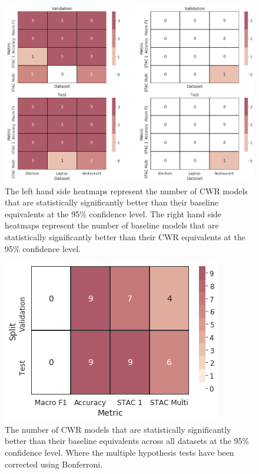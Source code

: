 \begin{figure}[!h]
    \centering
    \includegraphics[scale=0.4]{images/augmentation/methods_performance/CWR/cwr_dataset_metric_sig.png}
    \caption{The left hand side heatmaps represent the number of CWR models that are statistically significantly better than their baseline equivalents at the 95\% confidence level. The right hand side heatmaps represent the number of baseline models that are statistically significantly better than their CWR equivalents at the 95\% confidence level.}
    \label{fig:aug_cwr_dataset_metric_sig}
\end{figure}

\begin{figure}[!h]
    \centering
    \includegraphics[scale=0.4]{images/augmentation/methods_performance/CWR/cwr_sig_metric.png}
    \caption{The number of CWR models that are statistically significantly better than their baseline equivalents across all datasets at the 95\% confidence level. Where the multiple hypothesis tests have been corrected using Bonferroni.}
    \label{fig:aug_cwr_sig_metric}
\end{figure}

